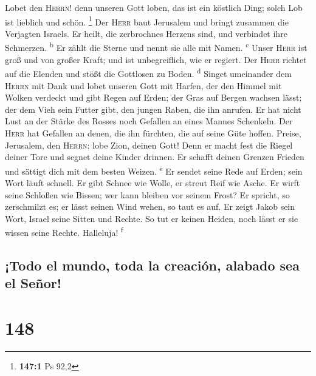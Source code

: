  Lobet den \textsc{Herrn}! denn unseren Gott loben, das
ist ein köstlich Ding; solch Lob ist lieblich und schön. \footnote{\textbf{147:1}
  Ps 92,2}  Der \textsc{Herr} baut Jerusalem und bringt
zusammen die Verjagten Israels.  Er heilt, die zerbrochnes
Herzens sind, und verbindet ihre Schmerzen. \textsuperscript{b}
 Er zählt die Sterne und nennt sie alle mit Namen.
\textsuperscript{c}  Unser \textsc{Herr} ist groß und von
großer Kraft; und ist unbegreiflich, wie er regiert.  Der
\textsc{Herr} richtet auf die Elenden und stößt die Gottlosen zu Boden.
\textsuperscript{d}  Singet umeinander dem \textsc{Herrn}
mit Dank und lobet unseren Gott mit Harfen,  der den
Himmel mit Wolken verdeckt und gibt Regen auf Erden; der Gras auf Bergen
wachsen lässt;  der dem Vieh sein Futter gibt, den jungen
Raben, die ihn anrufen.  Er hat nicht Lust an der Stärke
des Rosses noch Gefallen an eines Mannes Schenkeln.  Der
\textsc{Herr} hat Gefallen an denen, die ihn fürchten, die auf seine
Güte hoffen.  Preise, Jerusalem, den \textsc{Herrn}; lobe
Zion, deinen Gott!  Denn er macht fest die Riegel deiner
Tore und segnet deine Kinder drinnen.  Er schafft deinen
Grenzen Frieden und sättigt dich mit dem besten Weizen.
\textsuperscript{e}  Er sendet seine Rede auf Erden; sein
Wort läuft schnell.  Er gibt Schnee wie Wolle, er streut
Reif wie Asche.  Er wirft seine Schloßen wie Bissen; wer
kann bleiben vor seinem Frost?  Er spricht, so
zerschmilzt es; er lässt seinen Wind wehen, so taut es auf.
 Er zeigt Jakob sein Wort, Israel seine Sitten und
Rechte.  So tut er keinen Heiden, noch lässt er sie
wissen seine Rechte. Halleluja! \textsuperscript{f}

\hypertarget{todo-el-mundo-toda-la-creaciuxf3n-alabado-sea-el-seuxf1or}{%
\subsection{¡Todo el mundo, toda la creación, alabado sea el
Señor!}\label{todo-el-mundo-toda-la-creaciuxf3n-alabado-sea-el-seuxf1or}}

\hypertarget{section-147}{%
\section{148}\label{section-147}}

